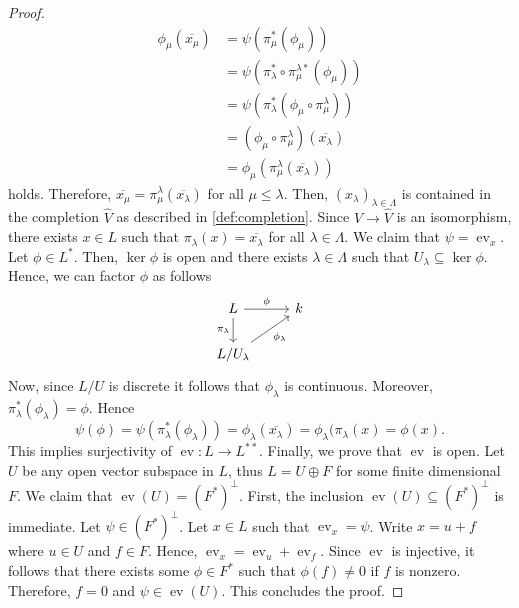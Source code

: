 \begin{proof}
	\begin{align*}
	\phi_{\mu}(\overline{x_{\mu}}) &= \psi(\pi_{\mu}^{*}(\phi_{\mu})) \\
	&= \psi(\pi_{\lambda}^{*} \circ \pi_{\mu}^{\lambda*}(\phi_{\mu})) \\
	&= \psi(\pi_{\lambda}^{*}(\phi_{\mu} \circ \pi_{\mu}^{\lambda})) \\
	&= (\phi_{\mu} \circ \pi_{\mu}^{\lambda})(\overline{x_{\lambda}}) \\
	&= \phi_{\mu}(\pi_{\mu}^{\lambda}(\overline{x_{\lambda}}))
	\end{align*}
	holds. Therefore, $\overline{x_\mu} = \pi_{\mu}^{\lambda}(\overline{x_{\lambda}})$ for all $\mu \leq \lambda$. Then, $(x_{\lambda})_{\lambda\in \Lambda}$ is contained in the completion $\widehat{V}$ as described in \cref{def:completion}. Since $V \to \widehat{V}$ is an isomorphism, there exists $x\in L$ such that $\pi_{\lambda}(x) = \overline{x_{\lambda}}$ for all $\lambda\in \Lambda$. We claim that $\psi = \operatorname{ev}_{x}$. Let $\phi \in L^{*}$. Then, $\ker\phi$ is open and there exists $\lambda\in \Lambda$ such that $U_{\lambda} \subseteq \ker\phi$. Hence, we can factor $\phi$ as follows
	\[
	\begin{tikzcd}
		L \arrow[r, "\phi"] \arrow[d, swap, "\pi_{\lambda}"] & k \\
		L/U_{\lambda} \arrow[ur, swap, "\phi_{\lambda}"] &
	\end{tikzcd}
	\]
	Now, since $L/U$ is discrete it follows that $\phi_{\lambda}$ is continuous. Moreover, $\pi_{\lambda}^{*}(\phi_{\lambda}) = \phi$. Hence
	\[
		\psi(\phi) = \psi(\pi_{\lambda}^{*}(\phi_{\lambda})) = \phi_{\lambda}(\overline{x_{\lambda}}) = \phi_{\lambda}(\pi_{\lambda}(x) = \phi(x).
	\]
	This implies surjectivity of $\operatorname{ev}\colon L \to L^{**}$. Finally, we prove that $\operatorname{ev}$ is open. Let $U$ be any open vector subspace in $L$, thus $L = U \oplus F$ for some finite dimensional $F$. We claim that $\operatorname{ev}(U) = (F^{*})^{\perp}$. First, the inclusion $\operatorname{ev}(U) \subseteq (F^{*})^{\perp}$ is immediate. Let $\psi \in (F^{*})^{\perp}$. Let $x \in L$ such that $\operatorname{ev}_{x} = \psi$. Write $x = u + f$ where $u \in U$ and $f \in F$. Hence, $\operatorname{ev}_{x} = \operatorname{ev}_{u} + \operatorname{ev}_{f}$. Since $\operatorname{ev}$ is injective, it follows that there exists some $\phi\in F^{*}$ such that $\phi(f) \neq 0$ if $f$ is nonzero. Therefore, $f = 0$ and $\psi \in \operatorname{ev}(U)$. This concludes the proof.
\end{proof}
